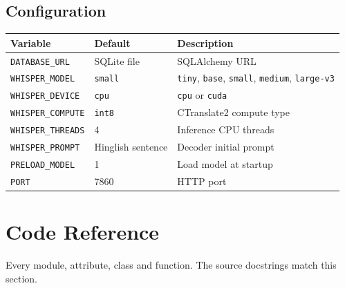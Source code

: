 \documentclass[11pt,a4paper]{article}
\begin{document}
\subsection{Configuration}
\begin{table}[H]
\centering
\begin{tabularx}{\linewidth}{@{}llX@{}}
\toprule
\textbf{Variable} & \textbf{Default} & \textbf{Description}\\
\midrule
\texttt{DATABASE\_URL} & SQLite file & SQLAlchemy URL\\
\texttt{WHISPER\_MODEL} & \texttt{small} & \texttt{tiny}, \texttt{base}, \texttt{small}, \texttt{medium}, \texttt{large-v3}\\
\texttt{WHISPER\_DEVICE} & \texttt{cpu} & \texttt{cpu} or \texttt{cuda}\\
\texttt{WHISPER\_COMPUTE} & \texttt{int8} & CTranslate2 compute type\\
\texttt{WHISPER\_THREADS} & 4 & Inference CPU threads\\
\texttt{WHISPER\_PROMPT} & Hinglish sentence & Decoder initial prompt\\
\texttt{PRELOAD\_MODEL} & 1 & Load model at startup\\
\texttt{PORT} & 7860 & HTTP port\\
\bottomrule
\end{tabularx}
\end{table}

\section{Code Reference}
Every module, attribute, class and function. The source docstrings match this section.
\end{document}
